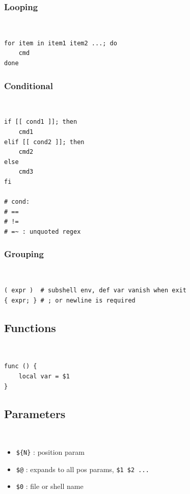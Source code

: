 \documentclass{blog}
\begin{document}
\subsubsection{Looping}
\begin{definition}[looping]~
    \begin{verbatim}
for item in item1 item2 ...; do
    cmd
done
\end{verbatim}
\end{definition}

\subsubsection{Conditional}
\begin{definition}[conditional]~
    \begin{verbatim}
if [[ cond1 ]]; then
    cmd1
elif [[ cond2 ]]; then
    cmd2
else
    cmd3
fi

# cond:
# ==
# !=
# =~ : unquoted regex
\end{verbatim}
\end{definition}

\subsubsection{Grouping}
\begin{definition}[grouping]~
    \begin{verbatim}
( expr )  # subshell env, def var vanish when exit
{ expr; } # ; or newline is required
\end{verbatim}
\end{definition}

\subsection{Functions}
\begin{definition}[function]~
    \begin{verbatim}
func () {
    local var = $1
}
\end{verbatim}
\end{definition}

\subsection{Parameters}
\begin{definition}[parameters]~
    \begin{itemize}
        \item \verb|${N}| : position param
        \item \verb|$@| : expands to all pos params, \verb|$1 $2 ...|
        \item \verb|$0| : file or shell name
    \end{itemize}
\end{definition}
\end{document}
